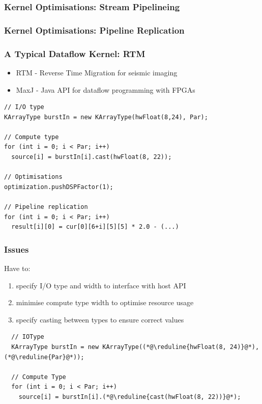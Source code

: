 \begin{frame}[fragile]
  \frametitle{Kernel Optimisations: Stream Pipelineing}
      \begin{figure}[!ht]
        \centering
        \def\svgwidth{.7\linewidth}
        
      \end{figure}
\end{frame}

\begin{frame}[fragile]
  \frametitle{Kernel Optimisations: Pipeline Replication}
      \begin{figure}[!ht]
        \centering
        \def\svgwidth{.7\linewidth}
        
      \end{figure}
\end{frame}

\begin{frame}[fragile]
  \frametitle{A Typical Dataflow Kernel: RTM}
  \begin{itemize}
    \item RTM - Reverse Time Migration for seismic imaging
    \item MaxJ - Java API for dataflow programming with FPGAs
  \end{itemize}

  \begin{lstlisting}
// I/O type
KArrayType burstIn = new KArrayType(hwFloat(8,24), Par);

// Compute type
for (int i = 0; i < Par; i++)
  source[i] = burstIn[i].cast(hwFloat(8, 22));

// Optimisations
optimization.pushDSPFactor(1);

// Pipeline replication
for (int i = 0; i < Par; i++)
  result[i][0] = cur[0][6+i][5][5] * 2.0 - (...)
\end{lstlisting}
\end{frame}

\begin{frame}[fragile]
  \frametitle{Issues}
  Have to:
  \begin{enumerate}

    \item specify I/O type and width to interface with host API
    \item minimise compute type width to optimise resource usage
    \item specify casting between types to ensure correct values
    \end{enumerate}

\begin{lstlisting}
  // IOType
  KArrayType burstIn = new KArrayType((*@\reduline{hwFloat(8, 24)}@*), (*@\reduline{Par}@*));

  // Compute Type
  for (int i = 0; i < Par; i++)
    source[i] = burstIn[i].(*@\reduline{cast(hwFloat(8, 22))}@*);
  \end{lstlisting}
\end{frame}

